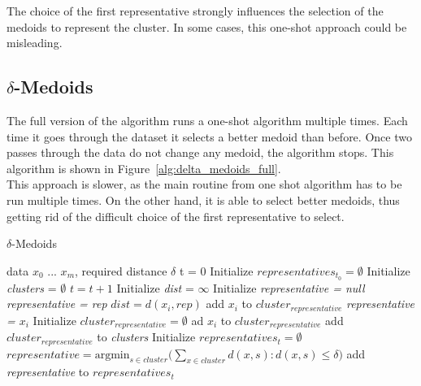 \documentclass[thesis=B,english]{FITthesis}[2012/10/20]
\begin{document}
The choice of the first representative strongly influences the selection of the medoids to represent the cluster.
In some cases, this one-shot approach could be misleading.

\subsection{$\delta$-Medoids}

The full version of the algorithm runs a one-shot algorithm multiple times.
Each time it goes through the dataset it selects a better medoid than before.
Once two passes through the data do not change any medoid, the algorithm stops.
This algorithm is shown in Figure~\ref{alg:delta_medoids_full}.\\

This approach is slower, as the main routine from one shot algorithm has to be run multiple times.
On the other hand, it is able to select better medoids, thus getting rid of the difficult choice of the first representative to select.

\begin{algorithm}\label{alg:delta_medoids_full}
    \caption{$\delta$-Medoids}
    \label{delta_medoids_full}
    \begin{algorithmic}[1]
        \INPUT data $x_0$ ... $x_m$, required distance $\delta$
        \STATE t = 0
        \STATE Initialize $representatives_{t_0} = \emptyset$
        \STATE Initialize \textit{clusters} = $\emptyset$
        \DO
            \STATE $t = t + 1$
                \STATE Initialize \textit{dist} = $\infty$
                \STATE Initialize \textit{representative = null}
                        \STATE \textit{representative = rep}
                        \STATE $dist = d(x_i, rep)$
                    \ENDIF
                \ENDFOR
                    \STATE add $x_i$ to $cluster_{representative}$
                \ELSE
                    \STATE \textit{representative = $x_i$}
                    \STATE Initialize $cluster_{representative} = \emptyset$
                    \STATE ad $x_i$ to $cluster_{representative}$
                    \STATE add $cluster_{representative}$ to \textit{clusters}
                \ENDIF
            \ENDFOR
            \STATE Initialize $representatives_t = \emptyset$
                \STATE $representative = \textrm{argmin}_{s \in cluster} (\sum\limits_{x \in cluster}{d(x,s) : d(x,s) \le \delta)}$
                \STATE add \textit{representative} to $representatives_t$
            \ENDFOR
    \end{algorithmic}
\end{algorithm} 
\end{document}
